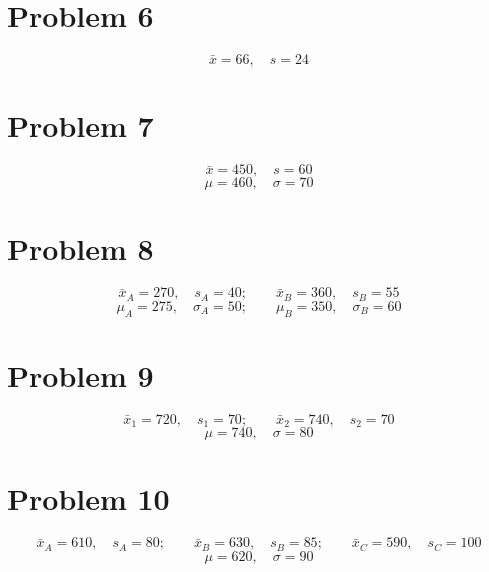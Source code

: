\section*{Problem 6}
\[
\bar{x} = 66,\quad s = 24
\]

\section*{Problem 7}
\[
\bar{x} = 450,\quad s = 60
\]
\[
\mu = 460,\quad \sigma = 70
\]

\section*{Problem 8}
\[
\bar{x}_{A} = 270,\quad s_{A} = 40;\qquad \bar{x}_{B} = 360,\quad s_{B} = 55
\]
\[
\mu_{A} = 275,\quad \sigma_{A} = 50;\qquad \mu_{B} = 350,\quad \sigma_{B} = 60
\]

\section*{Problem 9}
\[
\bar{x}_{1} = 720,\quad s_{1} = 70;\qquad \bar{x}_{2} = 740,\quad s_{2} = 70
\]
\[
\mu = 740,\quad \sigma = 80
\]

\section*{Problem 10}
\[
\bar{x}_{A} = 610,\quad s_{A} = 80;\qquad \bar{x}_{B} = 630,\quad s_{B} = 85;\qquad \bar{x}_{C} = 590,\quad s_{C} = 100
\]
\[
\mu = 620,\quad \sigma = 90
\]


